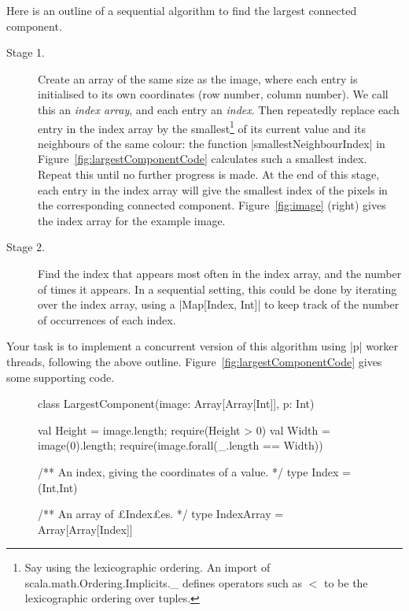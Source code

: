 \begin{question}
Here is an outline of a sequential algorithm to find  the largest connected
component.  
%
\begin{description}
\item[Stage 1.] Create an array of the same size as the image, where each
  entry is initialised to its own coordinates (row number, column number).  We
  call this an \emph{index array}, and each entry an \emph{index}.  Then
  repeatedly replace each entry in the index array by the
  smallest\footnote{Say using the lexicographic ordering.  An import of
    {\scalashape scala.math.Ordering.Implicits.\_} defines operators such as
    $<$ to be the lexicographic ordering over tuples.} of its current value
  and its neighbours of the same colour: the function |smallestNeighbourIndex|
  in Figure~\ref{fig:largestComponentCode} calculates such a smallest index.
  Repeat this until no further progress is made.  At the end of this stage,
  each entry in the index array will give the smallest index of the pixels in
  the corresponding connected component.  Figure~\ref{fig:image} (right) gives
  the index array for the example image.

\item[Stage 2.] Find the index that appears most often in the index array, and
  the number of times it appears.  In a sequential setting, this could be done
  by iterating over the index array, using a |Map[Index, Int]| to keep track
  of the number of occurrences of each index.
\end{description}

Your task is to implement a concurrent version of this algorithm using |p|
worker threads, following the above outline.
Figure~\ref{fig:largestComponentCode} gives some supporting code.


\begin{figure}[t]
\begin{scala}
class LargestComponent(image: Array[Array[Int]], p: Int){
  val Height = image.length; require(Height > 0)
  val Width = image(0).length; require(image.forall(_.length == Width))

  /** An index, giving the coordinates of a value. */
  type Index = (Int,Int)

  /** An array of £Index£es. */
  type IndexArray = Array[Array[Index]]

}
\end{scala}
\end{figure}
\end{question}

